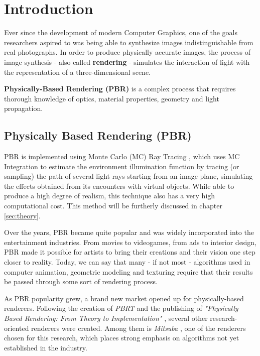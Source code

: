 \chapter{Introduction}
\label{sec:intro}

Ever since the development of modern Computer Graphics, one of the goals 
researchers aspired to was being able to synthesize images indistinguishable 
from real photographs. In order to produce physically accurate images, the 
process of image synthesis - also called \textbf{rendering} - simulates the 
interaction of light with the representation of a three-dimensional scene. 

\textbf{Physically-Based Rendering (PBR)} is a complex process that requires 
thorough knowledge of optics, material properties, geometry and light 
propagation.

\section{Physically Based Rendering (PBR)}
PBR is implemented using Monte Carlo (MC) Ray Tracing \cite{Lafortune96mathematicalmodels}, which uses MC 
Integration \cite{Keller:2007} to estimate the environment illumination function 
by tracing (or sampling) the path of several light rays starting from an image 
plane, simulating the effects obtained from its encounters with virtual objects. 
While able to produce a high degree of realism, this technique also has a very 
high computational cost. This method will be furtherly discussed in chapter \ref{sec:theory}.

Over the years, PBR became quite popular and was widely incorporated into the 
entertainment industries. From movies to videogames, from ads to interior 
design, PBR made it possible for artists to bring their creations and their 
vision one step closer to reality. Today, we can say that many - if not most - 
algorithms used in computer animation, geometric modeling and texturing require 
that their results be passed through some sort of rendering process.

As PBR popularity grew, a brand new market opened up for physically-based 
renderers. Following the creation of \textit{PBRT} and the publishing of 
\textit{"Physically Based Rendering: From Theory to Implementation"} 
\cite{pbrt}, several other research-oriented renderers were created. Among them 
is \textit{Mitsuba} \cite{mitsuba}, one of the renderers chosen for this research, which places 
strong emphasis on algorithms not yet established in the industry.

